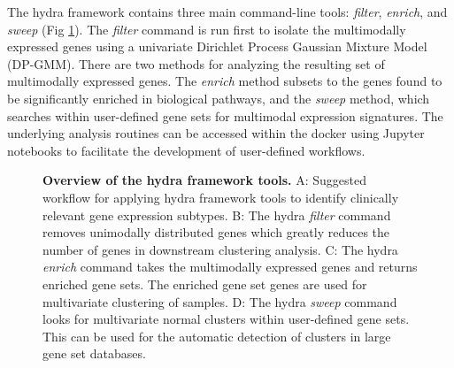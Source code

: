 \documentclass[10pt,letterpaper]{article}
\begin{document}
The hydra framework contains three main command-line tools: \textit{filter}, \textit{enrich}, and \textit{sweep} (Fig \ref{overview}). The \textit{filter} command is run first to isolate the multimodally expressed genes using a univariate Dirichlet Process Gaussian Mixture Model (DP-GMM). There are two methods for analyzing the resulting set of multimodally expressed genes. The \textit{enrich} method subsets to the genes found to be significantly enriched in biological pathways, and the \textit{sweep} method, which searches within user-defined gene sets for multimodal expression signatures. The underlying analysis routines can be accessed within the docker using Jupyter notebooks to facilitate the development of user-defined workflows.

\begin{figure}[h!]
	\caption{{\bf Overview of the hydra framework tools.}
		A: Suggested workflow for applying hydra framework tools to identify clinically relevant gene expression subtypes. B: The hydra \textit{filter} command removes unimodally distributed genes which greatly reduces the number of genes in downstream clustering analysis. C: The hydra \textit{enrich} command takes the multimodally expressed genes and returns enriched gene sets. The enriched gene set genes are used for multivariate clustering of samples. D: The hydra 
	    \textit{sweep} command looks for multivariate normal clusters within user-defined gene sets. This can be used for the automatic detection of clusters in large gene set databases.
		\label{overview}}
\end{figure}
\end{document}
